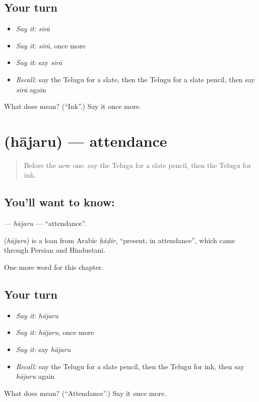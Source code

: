 \subsection*{Your turn}
\begin{itemize}
\raggedright
  \item \emph{Say it:} \emph{sirā}
  \item \emph{Say it:} \emph{sirā}, once more
  \item \emph{Say it:} say \emph{sirā}
  \item \emph{Recall:} say the Telugu for a slate, then the Telugu for a slate pencil, then say \emph{sirā} again
\end{itemize}

\begin{tcolorbox}[breakable,colback=teal!4,colframe=teal!35!black,title={Before you move on}]
What does  mean? (\textquotedblleft{}Ink\textquotedblright{}.) Say it once more.
\end{tcolorbox}
\section[\texorpdfstring{\te{హాజరు} (hājaru)}{హాజరు (hājaru)}]{ (hājaru) — attendance}

\label{lesson:TE-C313-hajaru}



\begin{quote}
Before the new one: say the Telugu for a slate pencil, then the Telugu for ink.
\end{quote}

\subsection*{You'll want to know: }
\textbf{} — \emph{hājaru} — \textquotedblleft{}attendance\textquotedblright{}.

\begin{cousinweb}
\textbf{} (\emph{hājaru}) is a loan from Arabic \emph{ḥāḍir}, \textquotedblleft{}present, in attendance\textquotedblright{}, which came through Persian and Hindustani.
\end{cousinweb}

\begin{grammarlens}[title={What you've built}]
One more word for this chapter.
\end{grammarlens}

\subsection*{Your turn}
\begin{itemize}
\raggedright
  \item \emph{Say it:} \emph{hājaru}
  \item \emph{Say it:} \emph{hājaru}, once more
  \item \emph{Say it:} say \emph{hājaru}
  \item \emph{Recall:} say the Telugu for a slate pencil, then the Telugu for ink, then say \emph{hājaru} again
\end{itemize}

\begin{tcolorbox}[breakable,colback=teal!4,colframe=teal!35!black,title={Before you move on}]
What does  mean? (\textquotedblleft{}Attendance\textquotedblright{}.) Say it once more.
\end{tcolorbox}
